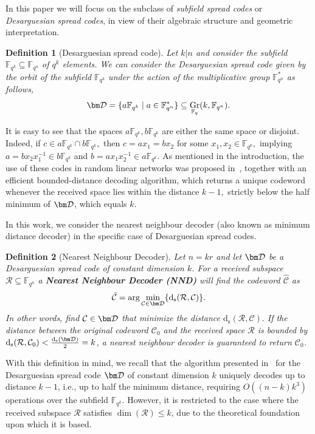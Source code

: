 \documentclass{article}
\newtheorem{definition}{Definition}
\newcommand{\Fq}{\mathbb{F}_{q}}
\newcommand{\Fqn}{\mathbb{F}_{q^n}}
\newcommand{\Fqk}{\mathbb{F}_{q^k}}
\newcommand{\ds}{\mathrm{d_s}}
\newcommand{\calC}{\mathcal{C}}
\newcommand{\calD}{\mathcal{D}}
\newcommand{\calR}{\mathcal{R}}
\DeclareMathOperator{\Gr}{Gr}
\begin{document}
In this paper we will focus on the subclass of \textit{subfield spread codes} or \textit{Desarguesian spread codes}, in view of their algebraic structure and geometric interpretation.
\begin{definition}[Desarguesian spread code]
\label{def:subfield_spread}
   Let $k|n$ and consider the subfield $\Fqk \subseteq \Fqn$ of $q^k$ elements.
   We can consider the Desarguesian spread code given by the orbit of the subfield $\Fqk$ under the action of the multiplicative group $\Fqn^*$ as follows,
   $$
    \bm  \calD = \{ a \Fqk \mid a \in \Fqn^*\} \subseteq \Gr_{\Fq}(k,\Fqn).
   $$
\end{definition}
It is easy to see that the spaces $a \Fqk, b \Fqk$ are either the same space or disjoint.
Indeed, if $c \in a \Fqk \cap b \Fqk,$ then $c = a x_1 = b x_2$ for some $x_1,x_2 \in \Fqk,$ implying $a = b x_2 x_1^{-1} \in b \Fqk$ and $b = a x_1 x_2^{-1} \in a \Fqk$.
As mentioned in the introduction, the use of these codes in random linear networks  was proposed in~\cite[Definition 2]{Gorla08},\cite[Lemma 5, Theorem 6]{Gorla11} together with an efficient bounded-distance decoding algorithm, which returns a unique codeword whenever the received space lies within the distance $k-1,$ strictly below the half minimum of $\bm \calD$, which equals $k$.
\\
\par In this work, we consider the nearest neighbour decoder (also known as minimum distance decoder) in the specific case of Desarguesian spread codes.
\begin{definition}[Nearest Neighbour Decoder]
    \label{def: Nearest neighbour decoder}
    Let $n=kr$ and let $
    \bm  \calD$ be a Desarguesian spread code of constant dimension $k$.
    For a received subspace $\calR \subseteq \Fqn$ a
    \textbf{Nearest Neighbour Decoder (NND)} will find the codeword $\hat{\calC}$ as
    \[
   \hat{\calC} = \arg \min_{\calC \in \bm \calD} \{ \ds(\calR,\calC)\}. \]
    In other words, find $\calC \in \bm \calD$ that minimize the distance $\ds(\calR,\calC).$
    If the distance between the original codeword $\calC_0$ and the received space $\calR$ is bounded by
    $\ds(\calR,\calC_0) <\frac{\ds(\bm  \calD)}{2}=k$, a nearest neighbour decoder is guaranteed to return $\calC_0$.
\end{definition}
With this definition in mind, we recall that the algorithm presented in~\cite{Gorla11} for the Desarguesian spread code $\bm\calD$ of constant dimension $k$ uniquely decodes up to distance $k-1$, i.e., up to half the minimum distance, requiring $O((n-k)k^3)$ operations over the subfield $\Fqk$. However, it is restricted to the case where the received subspace $\calR$ satisfies $\dim(\calR)\leq k$, due to the theoretical foundation upon which it is based.
\end{document}
